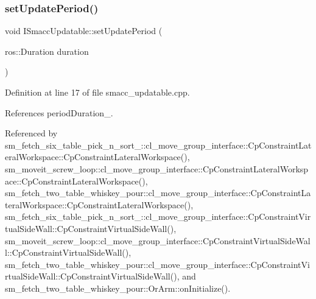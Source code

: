 \subsubsection{\texorpdfstring{set\+Update\+Period()}{setUpdatePeriod()}}
{\footnotesize\ttfamily void I\+Smacc\+Updatable\+::set\+Update\+Period (\begin{DoxyParamCaption}\item[{ros\+::\+Duration}]{duration }\end{DoxyParamCaption})}



Definition at line 17 of file smacc\+\_\+updatable.\+cpp.



References period\+Duration\+\_\+.



Referenced by sm\+\_\+fetch\+\_\+six\+\_\+table\+\_\+pick\+\_\+n\+\_\+sort\+\_\+::cl\+\_\+move\+\_\+group\+\_\+interface\+::\+Cp\+Constraint\+Lateral\+Workspace\+::\+Cp\+Constraint\+Lateral\+Workspace(), sm\+\_\+moveit\+\_\+screw\+\_\+loop\+::cl\+\_\+move\+\_\+group\+\_\+interface\+::\+Cp\+Constraint\+Lateral\+Workspace\+::\+Cp\+Constraint\+Lateral\+Workspace(), sm\+\_\+fetch\+\_\+two\+\_\+table\+\_\+whiskey\+\_\+pour\+::cl\+\_\+move\+\_\+group\+\_\+interface\+::\+Cp\+Constraint\+Lateral\+Workspace\+::\+Cp\+Constraint\+Lateral\+Workspace(), sm\+\_\+fetch\+\_\+six\+\_\+table\+\_\+pick\+\_\+n\+\_\+sort\+\_\+::cl\+\_\+move\+\_\+group\+\_\+interface\+::\+Cp\+Constraint\+Virtual\+Side\+Wall\+::\+Cp\+Constraint\+Virtual\+Side\+Wall(), sm\+\_\+moveit\+\_\+screw\+\_\+loop\+::cl\+\_\+move\+\_\+group\+\_\+interface\+::\+Cp\+Constraint\+Virtual\+Side\+Wall\+::\+Cp\+Constraint\+Virtual\+Side\+Wall(), sm\+\_\+fetch\+\_\+two\+\_\+table\+\_\+whiskey\+\_\+pour\+::cl\+\_\+move\+\_\+group\+\_\+interface\+::\+Cp\+Constraint\+Virtual\+Side\+Wall\+::\+Cp\+Constraint\+Virtual\+Side\+Wall(), and sm\+\_\+fetch\+\_\+two\+\_\+table\+\_\+whiskey\+\_\+pour\+::\+Or\+Arm\+::on\+Initialize().


